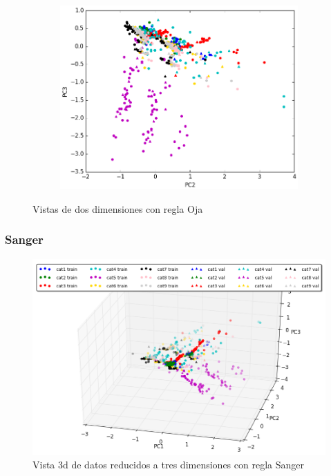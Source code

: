 \begin{figure}[ht!]
\begin{subfigure}[b]{0.5\textwidth}
		\includegraphics[width=\linewidth]{img/oja/3dim-pc2-pc3.png}
	\end{subfigure}%
	\caption{Vistas de dos dimensiones con regla Oja}
\end{figure}



\newpage
\subsubsection{Sanger}

\begin{figure}[ht!]
	\centering
	\includegraphics[width=0.8\linewidth]{img/parte1-vista3d-sanger.png}

	\caption{Vista 3d de datos reducidos a tres dimensiones con regla Sanger}
\end{figure}


